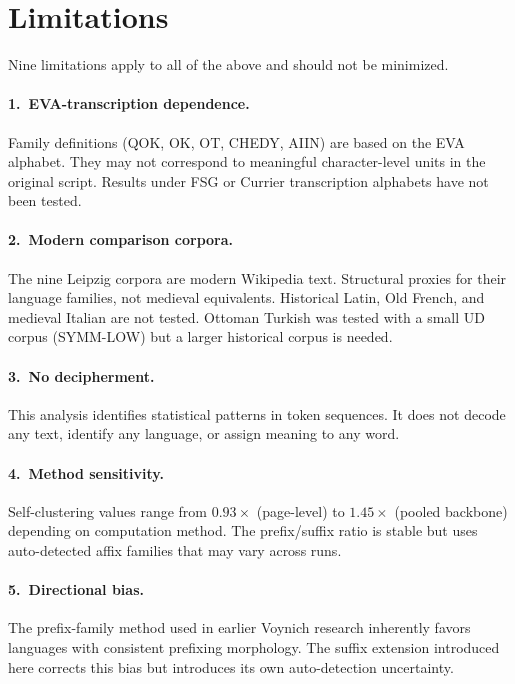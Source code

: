 \documentclass[11pt]{article}
\begin{document}
\section{Limitations}
\label{sec:limitations}

Nine limitations apply to all of the above and should not be minimized.

\paragraph{1.~EVA-transcription dependence.} Family definitions (QOK, OK,
OT, CHEDY, AIIN) are based on the EVA alphabet. They may not correspond
to meaningful character-level units in the original script. Results under
FSG or Currier transcription alphabets have not been tested.

\paragraph{2.~Modern comparison corpora.} The nine Leipzig corpora are
modern Wikipedia text. Structural proxies for their language families, not
medieval equivalents. Historical Latin, Old French, and medieval Italian
are not tested. Ottoman Turkish was tested with a small UD corpus
(SYMM-LOW) but a larger historical corpus is needed.

\paragraph{3.~No decipherment.} This analysis identifies statistical
patterns in token sequences. It does not decode any text, identify any
language, or assign meaning to any word.

\paragraph{4.~Method sensitivity.} Self-clustering values range from
$0.93\times$ (page-level) to $1.45\times$ (pooled backbone) depending on
computation method. The prefix/suffix ratio is stable but uses
auto-detected affix families that may vary across runs.

\paragraph{5.~Directional bias.} The prefix-family method used in earlier
Voynich research inherently favors languages with consistent prefixing
morphology. The suffix extension introduced here corrects this bias but
introduces its own auto-detection uncertainty.
\end{document}
